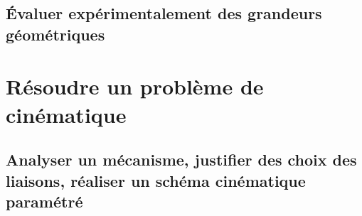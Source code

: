\graphicspath{{\repStyle/png/}{../GEO/GEO-03/12_BielleManivelle/images/}} 
 
 
\graphicspath{{\repStyle/png/}{../GEO/GEO-03/13_TransfoMouvement/images/}} 
 
 
\graphicspath{{\repStyle/png/}{../GEO/GEO-03/14_Sympact/images/}} 
 
 
\graphicspath{{\repStyle/png/}{../GEO/GEO-03/15_SympactGalet/images/}} 
 
 
\graphicspath{{\repStyle/png/}{../GEO/GEO-03/16_Poussoir/images/}} 
 
 
\graphicspath{{\repStyle/png/}{../GEO/GEO-03/17_4Barres/images/}} 
 
 
\graphicspath{{\repStyle/png/}{../GEO/GEO-03/18_Maxpid/images/}} 
 
 
\graphicspath{{\repStyle/png/}{../GEO/GEO-03/19_Graham/images/}} 
 
 
\graphicspath{{\repStyle/png/}{../GEO/GEO-03/20_VariateurBilles/images/}} 
 
 
\graphicspath{{\repStyle/png/}{../GEO/GEO-03/54_FauteuilRoulant/images/}} 
 
 
\graphicspath{{\repStyle/png/}{../GEO/GEO-03/64_EPAS/images/}} 
 
 
\clearpage 
\newpage 
\section{Évaluer expérimentalement des grandeurs géométriques} 
\clearpage 
\newpage 
\setchapterpreamble[u]{\margintoc} 
\chapter{Résoudre un problème de cinématique} 
\section{Analyser un mécanisme, justifier des choix des liaisons, réaliser un schéma cinématique paramétré} 
\graphicspath{{\repStyle/png/}{../CIN/CIN-01-ModeliserSchemasCinematiques/01_T/images/}} 
 
 
